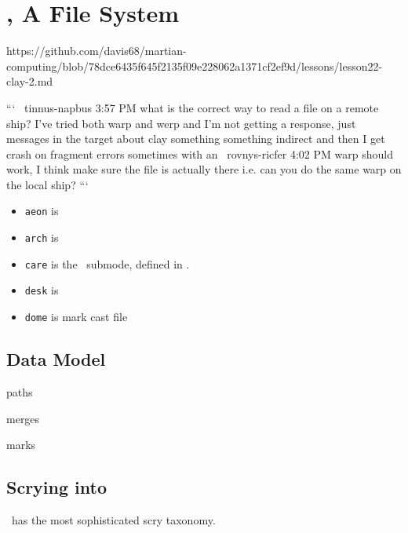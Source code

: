 \section[\clay]{\clay, A File System}

https://github.com/davis68/martian-computing/blob/78dce6435f645f2135f09e228062a1371cf2ef9d/lessons/lesson22-clay-2.md

```
~tinnus-napbus
3:57 PM
what is the correct way to read a file on a remote ship? I've tried both warp and werp and I'm not getting a response, just messages in the target about clay something something indirect and then I get crash on fragment errors sometimes
with an %
~rovnys-ricfer
4:02 PM
warp should work, I think
make sure the file is actually there
i.e. can you do the same warp on the local ship?
```

\begin{itemize}
  \item  \texttt{aeon} is
  \item  \texttt{arch} is
  \item  \texttt{care} is the \clay~submode, defined in \lull.
  \item  \texttt{desk} is
  \item  \texttt{dome} is
  mark cast file
\end{itemize}


\subsection{Data Model}

paths

merges

marks

\subsection{Scrying into \clay}

\clay~has the most sophisticated scry taxonomy.

